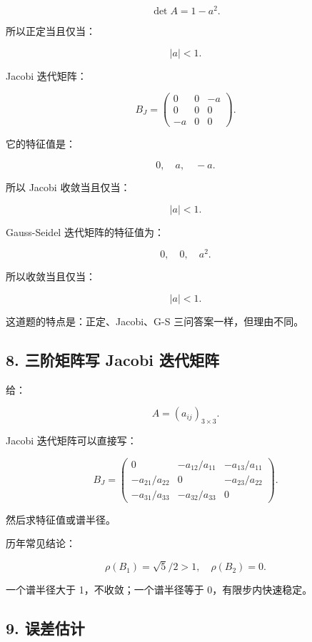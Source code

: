 \documentclass[11pt,a4paper]{ctexart}
\begin{document}
\[
\det A=1-a^2.
\]

所以正定当且仅当：

\[
|a|<1.
\]

Jacobi 迭代矩阵：

\[
B_J=
\begin{pmatrix}
0&0&-a\\
0&0&0\\
-a&0&0
\end{pmatrix}.
\]

它的特征值是：

\[
0,\quad a,\quad -a.
\]

所以 Jacobi 收敛当且仅当：

\[
|a|<1.
\]

Gauss-Seidel 迭代矩阵的特征值为：

\[
0,\quad 0,\quad a^2.
\]

所以收敛当且仅当：

\[
|a|<1.
\]

这道题的特点是：正定、Jacobi、G-S 三问答案一样，但理由不同。


\subsection*{8. 三阶矩阵写 Jacobi 迭代矩阵}


给：

\[
A=(a_{ij})_{3\times 3}.
\]

Jacobi 迭代矩阵可以直接写：

\[
B_J=
\begin{pmatrix}
0&-a_{12}/a_{11}&-a_{13}/a_{11}\\
-a_{21}/a_{22}&0&-a_{23}/a_{22}\\
-a_{31}/a_{33}&-a_{32}/a_{33}&0
\end{pmatrix}.
\]

然后求特征值或谱半径。

历年常见结论：

\[
\rho(B_1)=\sqrt5/2>1,
\quad
\rho(B_2)=0.
\]

一个谱半径大于 1，不收敛；一个谱半径等于 0，有限步内快速稳定。


\subsection*{9. 误差估计}
\end{document}
